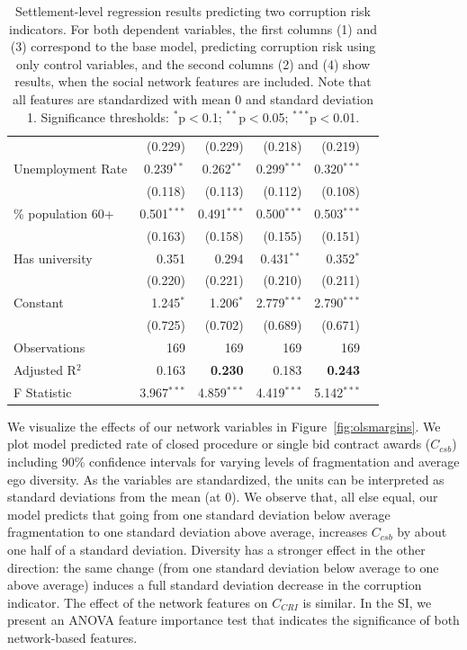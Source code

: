 \begin{table}
\begin{tabular}{l r r r r r }
  &  (0.229) & (0.229) & (0.218) & (0.219) \\ [.3cm]
 Unemployment Rate & 0.239$^{**}$ & 0.262$^{**}$ & 0.299$^{***}$ & 0.320$^{***}$ \\ 
 & (0.118) & (0.113) & (0.112) & (0.108) \\ [.3cm]
 \% population 60+ & 0.501$^{***}$ & 0.491$^{***}$ & 0.500$^{***}$ & 0.503$^{***}$ \\ 
  & (0.163) & (0.158) & (0.155) & (0.151) \\ [.3cm]
 Has university  & 0.351 & 0.294 & 0.431$^{**}$ & 0.352$^{*}$ \\ 
  & (0.220) & (0.221) & (0.210) & (0.211) \\ [.3cm]
 Constant  & 1.245$^{*}$ & 1.206$^{*}$ & 2.779$^{***}$ & 2.790$^{***}$ \\ 
   & (0.725) & (0.702) & (0.689) & (0.671) \\ [.15cm]
\hline
Observations & 169 & 169 & 169 & 169 \\ 
Adjusted R$^{2}$ & 0.163 & \textbf{0.230} & 0.183 & \textbf{0.243} \\ 
F Statistic &  3.967$^{***}$ & 4.859$^{***}$ & 4.419$^{***}$  & 5.142$^{***}$  \\ 
\bottomrule
\end{tabular} 
  \caption[Municipality corruption risk regressed on social capital variables.]{Settlement-level regression results predicting two corruption risk indicators. For both dependent variables, the first columns (1) and (3) correspond to the base model, predicting corruption risk using only control variables, and the second columns (2) and (4) show results, when the social network features are included. Note that all features are standardized with mean 0 and standard deviation 1. Significance thresholds: $^{*}$p$<$0.1; $^{**}$p$<$0.05; $^{***}$p$<$0.01.} 
  \label{tab:ols_regs}
\end{table} 


We visualize the effects of our network variables in Figure~\ref{fig:olsmargins}. We plot model predicted rate of closed procedure or single bid contract awards ($C_{csb}$) including 90\% confidence intervals for varying levels of fragmentation and average ego diversity. As the variables are standardized, the units can be interpreted as standard deviations from the mean (at 0). We observe that, all else equal, our model predicts that going from one standard deviation below average fragmentation to one standard deviation above average, increases $C_{csb}$ by about one half of a standard deviation. Diversity has a stronger effect in the other direction: the same change (from one standard deviation below average to one above average) induces a full standard deviation decrease in the corruption indicator. The effect of the network features on $C_{CRI}$ is similar. In the SI, we present an ANOVA feature importance test that indicates the significance of both network-based features.


